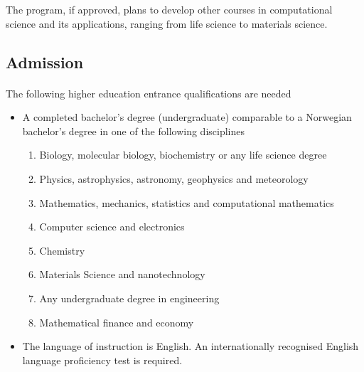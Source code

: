 \documentclass[%
twoside,                 %
final,                   %
10pt]{article}
\begin{document}
\noindent
The program, if approved, plans to develop other courses in computational science and its applications, ranging from life science to materials science.







\subsection{Admission}

\paragraph{}
The following higher education entrance qualifications are needed
\begin{itemize}
\item A completed bachelor's degree (undergraduate) comparable to a Norwegian bachelor's degree in one of the following disciplines
\begin{enumerate}

 \item Biology, molecular biology, biochemistry  or any life science degree

 \item Physics, astrophysics, astronomy, geophysics and meteorology

 \item Mathematics, mechanics, statistics and computational mathematics

 \item Computer science and electronics

 \item Chemistry

 \item Materials Science and nanotechnology

 \item Any undergraduate degree in engineering

 \item Mathematical finance and economy

\end{enumerate}

\noindent
\item The language of instruction is English. An internationally recognised English language proficiency test is required.
\end{itemize}
\end{document}
